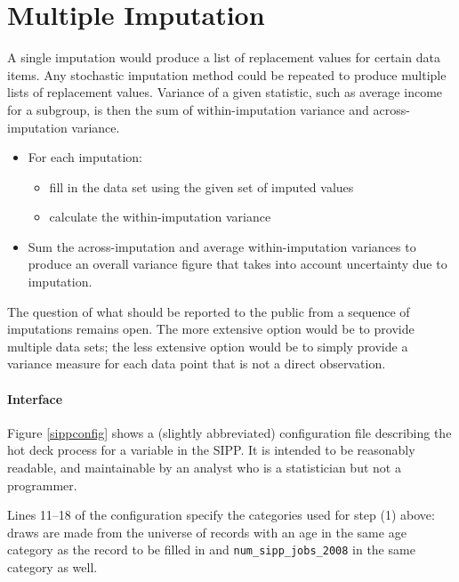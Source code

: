 \documentclass{article}
\def\tighten{ \setlength{\itemsep}{1pt}
    \setlength{\parskip}{0pt}}
\begin{document}
\section{Multiple Imputation}
A single imputation would produce a list of replacement
values for certain data items. Any stochastic imputation method could be repeated
to produce multiple lists of replacement values. Variance of a given statistic,
such as average income for a subgroup, is then the sum of within-imputation variance and
across-imputation variance.

\begin{itemize}
\tighten
\item For each imputation:
    \begin{itemize}
\tighten
    \item fill in the data set using the given set of imputed values
    \item calculate the within-imputation variance
    \end{itemize}
\item Sum the across-imputation and average within-imputation variances to
produce an overall variance figure that takes into account uncertainty due to imputation.
\end{itemize}

The question of what should be reported to the public from a sequence of imputations
remains open. The more extensive option would be to provide multiple data sets; the less
extensive option would be to simply provide a variance measure for each data point that
is not a direct observation.

        \paragraph{Interface} Figure \ref{sippconfig} shows a (slightly abbreviated)
        configuration file describing the hot deck process for a variable in the SIPP.
        It is intended to be reasonably readable, and maintainable by an analyst who is
        a statistician but not a programmer.

        Lines 11--18 of the configuration specify the
        categories used for step (1) above: draws are made from the universe of records with an
        age in the same age category as the record to be filled in and {\tt num\_sipp\_jobs\_2008} in the same
        category as well.
\end{document}
